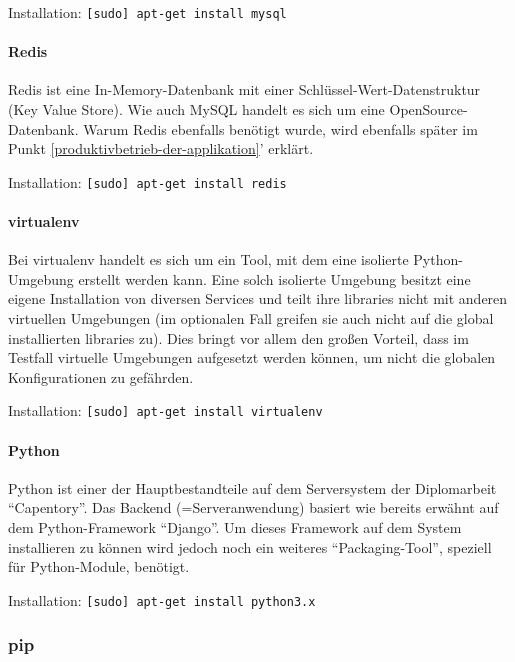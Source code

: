 Installation: \texttt{{[}sudo{]}\ apt-get\ install\ mysql}

\hypertarget{redis}{%
\paragraph{Redis}\label{redis}}

Redis ist eine In-Memory-Datenbank mit einer
Schlüssel-Wert-Datenstruktur (Key Value Store). Wie auch MySQL handelt
es sich um eine OpenSource-Datenbank. Warum Redis ebenfalls benötigt
wurde, wird ebenfalls später im Punkt \ref{produktivbetrieb-der-applikation}' erklärt.

Installation: \texttt{{[}sudo{]}\ apt-get\ install\ redis}

\hypertarget{virtualenv}{%
\paragraph{virtualenv}\label{virtualenv}}

Bei virtualenv handelt es sich um ein Tool, mit dem eine isolierte
Python-Umgebung erstellt werden kann. Eine solch isolierte Umgebung
besitzt eine eigene Installation von diversen Services und teilt ihre
libraries nicht mit anderen virtuellen Umgebungen (im optionalen Fall
greifen sie auch nicht auf die global installierten libraries zu). Dies
bringt vor allem den großen Vorteil, dass im Testfall virtuelle
Umgebungen aufgesetzt werden können, um nicht die globalen
Konfigurationen zu gefährden.

Installation: \texttt{{[}sudo{]}\ apt-get\ install\ virtualenv}

\hypertarget{python}{%
\paragraph{Python}\label{python}}

Python ist einer der Hauptbestandteile auf dem Serversystem der
Diplomarbeit ``Capentory''. Das Backend (=Serveranwendung) basiert wie
bereits erwähnt auf dem Python-Framework ``Django''. Um dieses Framework
auf dem System installieren zu können wird jedoch noch ein weiteres
``Packaging-Tool'', speziell für Python-Module, benötigt.

Installation: \texttt{{[}sudo{]}\ apt-get\ install\ python3.x}

\hypertarget{pip}{%
\subsubsection{pip}\label{pip}}

